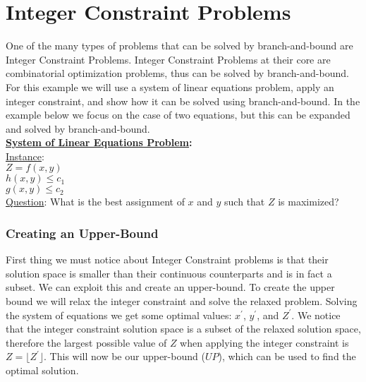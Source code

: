 \section{Integer Constraint Problems}
    One of the many types of problems that can be solved by 
    branch-and-bound are Integer Constraint Problems. 
    Integer Constraint Problems at their core are combinatorial 
    optimization problems, thus can be solved by branch-and-bound.
    For this example we will use a system of linear equations problem,
    apply an integer constraint, and show how it can be solved using 
    branch-and-bound. In the example below we focus on the case of 
    two equations, but this can be expanded and solved by branch-and-bound.
    \\ 
    \noindent
	\textbf{\underline{System of Linear Equations Problem}:}\\
	\underline{Instance}: \\ $Z = f(x,y)$  \\ $h(x,y) \leq c_1$ \\ $g(x,y) \leq c_2 $ \\
	\underline{Question}: What is the best assignment of $x$ and $y$ such that $Z$ is maximized?
    \\

        \subsubsection{Creating an Upper-Bound}
        First thing we must notice about Integer Constraint problems is that
        their solution space is smaller than their continuous counterparts and 
        is in fact a subset.
        We can exploit this and create an upper-bound. To create the upper bound
        we will relax the integer constraint and solve the relaxed problem.
        Solving the system of equations we get some optimal values: $x^{'}$, $y^{'}$, 
        and $Z^{'}$. We notice that the integer constraint solution
        space is a subset of the relaxed solution space, therefore the largest
        possible value of $Z$ when applying the integer constraint is 
        $ Z = \lfloor Z^{'} \rfloor$. This will now be our upper-bound ($UP$), which can be used
        to find the optimal solution.


